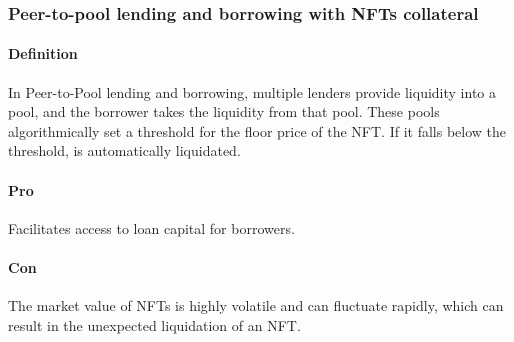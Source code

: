 \subsubsection{Peer-to-pool lending and borrowing with NFTs collateral}
\paragraph{Definition}
In Peer-to-Pool lending and borrowing, multiple lenders provide liquidity into a pool, and the borrower takes the liquidity from that pool. These pools algorithmically set a threshold for the floor price of the NFT. If it falls below the threshold, is automatically liquidated. 
\paragraph{Pro}
Facilitates access to loan capital for borrowers.
\paragraph{Con}
The market value of NFTs is highly volatile and can fluctuate rapidly, which can result in the unexpected liquidation of an NFT. 
